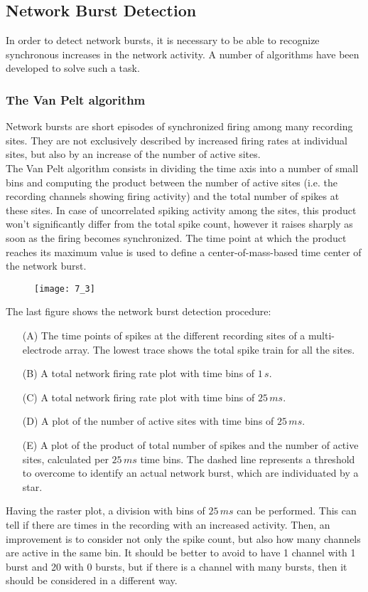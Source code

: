 \subsection{Network Burst Detection}
In order to detect network bursts, it is necessary to be able to recognize synchronous
increases in the network activity. A number of algorithms have been developed to
solve such a task.
\subsubsection{The Van Pelt algorithm}
Network bursts are short episodes of synchronized firing among many recording sites. They are not
exclusively described by increased firing rates at individual sites, but also by an
increase of the number of active sites.\\ 
The Van Pelt algorithm consists in dividing the time
axis into a number of small bins and computing the product between the number of
active sites (i.e. the recording channels showing firing activity) and the total
number of spikes at these sites. In case of uncorrelated spiking activity among
the sites, this product won't significantly differ from the total spike count, however
it raises sharply as soon as the firing becomes synchronized. The time point at
which the product reaches its maximum value is used to
define a center-of-mass-based time center of the network burst.
\begin{figure}[H]
    \texttt{[image: 7\_3]}
    \centering
\end{figure}
\pagebreak
The last figure shows the network burst detection procedure:
\begin{itemize}
    \item[(A)] The time points of spikes at the different recording sites of
          a multi-electrode array. The lowest trace shows the total spike train for all
          the sites.
    \item[(B)] A total network firing rate plot with time bins of \(1\,s\).
    \item[(C)] A total network firing rate plot with time bins of \(25\,ms\).
    \item[(D)] A plot of the number of active sites with time bins
          of \(25\,ms\).
    \item[(E)] A plot of the product of total number of spikes and the
          number of active sites, calculated per \(25\,ms\) time bins. The dashed line
          represents a threshold to overcome to identify an actual network burst, which
          are individuated by a star.
\end{itemize}
Having the raster plot, a division with bins of \(25\,ms\) can be performed. This can tell if there are times in the recording with an increased activity. Then, an improvement is to consider not only the spike count, but also how many channels are active in the same bin. It should be better to avoid to have 1 channel with 1 burst and 20 with 0 bursts, but if there is a channel with many bursts, then it should be considered in a different way.
